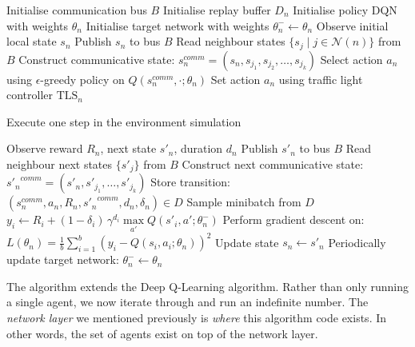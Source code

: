 \documentclass[a4paper]{report}
\begin{document}
\begin{algorithm}[H]
  \caption{Communicative Deep Q-Learning}
  \begin{algorithmic}[1]
  \State Initialise communication bus $B$
    \State Initialise replay buffer $D_n$
    \State Initialise policy DQN with weights $\theta_n$
    \State Initialise target network with weights $\theta_n^- \leftarrow \theta_n$
  \EndFor
        \State Observe initial local state $s_n$
        \State Publish $s_n$ to bus $B$
    \EndFor
        \State Read neighbour states $\{s_j \mid j \in \mathcal{N}(n)\}$ from $B$
        \State Construct communicative state: $s_n^{comm} = (s_n, s_{j_1}, s_{j_2}, \dots, s_{j_k})$
        \State Select action $a_n$ using $\epsilon$-greedy policy on $Q(s_n^{comm}, \cdot; \theta_n)$
        \State Set action $a_n$ using traffic light controller $\text{TLS}_n$
      \EndFor

      \State Execute one step in the environment simulation

        \State Observe reward $R_n$, next state $s'_n$, duration $d_n$
        \State Publish $s'_n$ to bus $B$
        \State Read neighbour next states $\{s'_j\}$ from $B$
        \State Construct next communicative state: ${s'_n}^{comm} = (s'_n, s'_{j_1}, \dots, s'_{j_k})$
        \State Store transition: $(s_n^{comm}, a_n, R_n, {s'_n}^{comm}, d_n, \delta_n) \in D$
        \State Sample minibatch from $D$
          \State $y_i \leftarrow R_i + (1 - \delta_i)\,\gamma^{d_i} \underset{a'}\max Q(s'_i, a'; \theta_n^-)$
        \EndFor
        \State Perform gradient descent on: $L(\theta_n) = \frac{1}{b} \sum_{i=1}^{b} \left(y_i - Q(s_i, a_i; \theta_n)\right)^2$
        \State Update state $s_n \leftarrow s'_n$
        \State Periodically update target network: $\theta_n^- \leftarrow \theta_n$
      \EndFor
    \EndFor
  \EndFor
  \end{algorithmic}
\end{algorithm}

The algorithm\footnotemark{} extends the Deep Q-Learning algorithm. Rather than only running a single agent, we now iterate through and run an indefinite number. The \emph{network layer} we mentioned previously is \emph{where} this algorithm code exists. In other words, the set of agents exist on top of the network layer.
\end{document}
